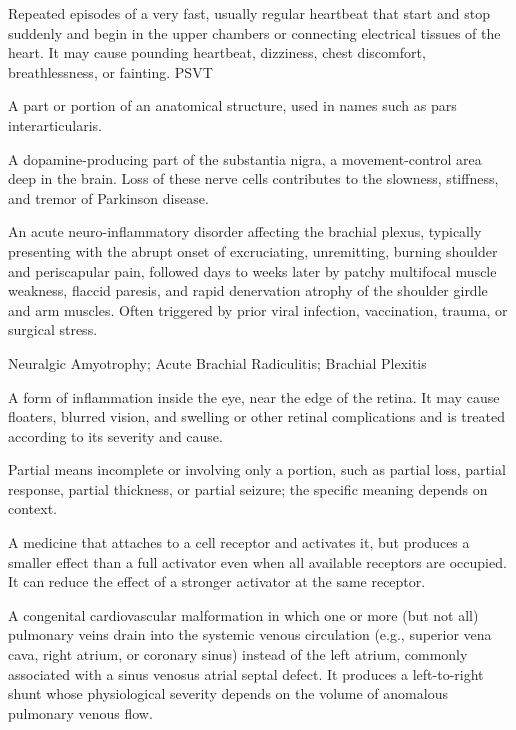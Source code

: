  Repeated episodes of a very fast, usually regular heartbeat that start and stop suddenly and begin in the upper chambers or connecting electrical tissues of the heart. It may cause pounding heartbeat, dizziness, chest discomfort, breathlessness, or fainting.
\synonyms
PSVT

 A part or portion of an anatomical structure, used in names such as pars interarticularis.

 A dopamine-producing part of the substantia nigra, a movement-control area deep in the brain. Loss of these nerve cells contributes to the slowness, stiffness, and tremor of Parkinson disease.

 An acute neuro-inflammatory disorder affecting the brachial plexus, typically presenting with the abrupt onset of excruciating, unremitting, burning shoulder and periscapular pain, followed days to weeks later by patchy multifocal muscle weakness, flaccid paresis, and rapid denervation atrophy of the shoulder girdle and arm muscles. Often triggered by prior viral infection, vaccination, trauma, or surgical stress.

\synonyms
Neuralgic Amyotrophy; Acute Brachial Radiculitis; Brachial Plexitis

 A form of inflammation inside the eye, near the edge of the retina. It may cause floaters, blurred vision, and swelling or other retinal complications and is treated according to its severity and cause.

 Partial means incomplete or involving only a portion, such as partial loss, partial response, partial thickness, or partial seizure; the specific meaning depends on context.

 A medicine that attaches to a cell receptor and activates it, but produces a smaller effect than a full activator even when all available receptors are occupied. It can reduce the effect of a stronger activator at the same receptor.

 A congenital cardiovascular malformation in which one or more (but not all) pulmonary veins drain into the systemic venous circulation (e.g., superior vena cava, right atrium, or coronary sinus) instead of the left atrium, commonly associated with a sinus venosus atrial septal defect. It produces a left-to-right shunt whose physiological severity depends on the volume of anomalous pulmonary venous flow.

